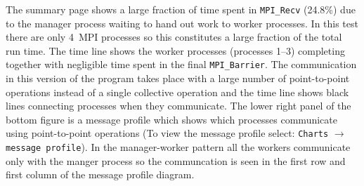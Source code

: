 \documentclass[a4paper,titlepage]{article}
\begin{document}
The summary page shows a large fraction of time spent in \verb+MPI_Recv+ (24.8\%) due to the manager process waiting to hand out work to worker processes. In this test there are only 4~MPI processes so this constitutes a large fraction of the total run time. The time line shows the worker processes (processes 1--3) completing together with negligible time spent in the final \verb+MPI_Barrier+. The communication in this version of the program takes place with a large number of point-to-point operations instead of a single collective operation and the time line shows black lines connecting processes when they communicate. The lower right panel of the bottom figure is a message profile which shows which processes communicate using point-to-point operations (To view the message profile select: \texttt{Charts} $\rightarrow$ \texttt{message profile}). In the manager-worker pattern all the workers communicate only with the manger process so the communcation is seen in the first row and first column of the message profile diagram. \\
\end{document}
